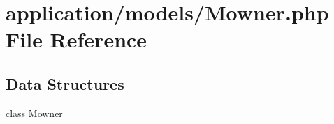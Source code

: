 \hypertarget{_mowner_8php}{}\section{application/models/\+Mowner.php File Reference}
\label{_mowner_8php}
\subsection*{Data Structures}
\begin{DoxyCompactItemize}
\item 
class \mbox{\hyperlink{class_mowner}{Mowner}}
\end{DoxyCompactItemize}
